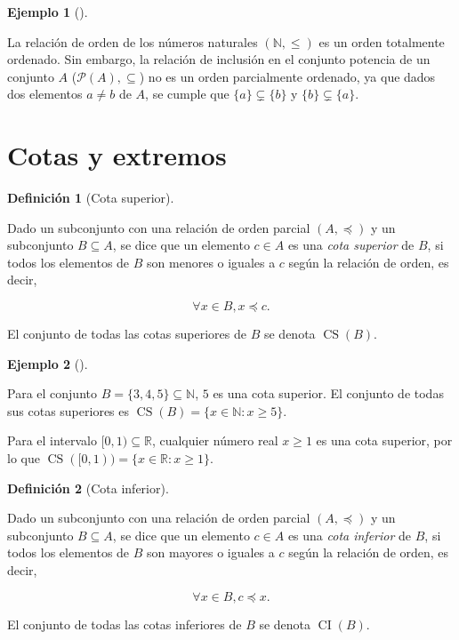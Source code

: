 \documentclass[
  a4paper,
]{scrreport}
\theoremstyle{definition}
\newtheorem{example}{Ejemplo}[chapter]
\theoremstyle{plain}
\theoremstyle{plain}
\theoremstyle{definition}
\newtheorem{definition}{Definición}[chapter]
\theoremstyle{plain}
\theoremstyle{remark}
\begin{document}
\begin{example}[]\protect\hypertarget{exm-relacion-orden-total}{}\label{exm-relacion-orden-total}

La relación de orden de los números naturales \((\mathbb{N},\leq)\) es
un orden totalmente ordenado. Sin embargo, la relación de inclusión en
el conjunto potencia de un conjunto \(A\) (\(\mathcal{P}(A),\subseteq\))
no es un orden parcialmente ordenado, ya que dados dos elementos
\(a\neq b\) de \(A\), se cumple que \(\{a\}\subsetneq \{b\}\) y
\(\{b\}\subsetneq \{a\}\).

\end{example}

\hypertarget{cotas-y-extremos}{%
\section{Cotas y extremos}\label{cotas-y-extremos}}

\begin{definition}[Cota
superior]\protect\hypertarget{def-cota-superior-conjunto}{}\label{def-cota-superior-conjunto}

Dado un subconjunto con una relación de orden parcial \((A,\preceq)\) y
un subconjunto \(B\subseteq A\), se dice que un elemento \(c\in A\) es
una \emph{cota superior} de \(B\), si todos los elementos de \(B\) son
menores o iguales a \(c\) según la relación de orden, es decir,

\[\forall x \in B, x\preceq c.\]

El conjunto de todas las cotas superiores de \(B\) se denota
\(\operatorname{CS}(B)\).

\end{definition}

\begin{example}[]\protect\hypertarget{exm-cota-superior}{}\label{exm-cota-superior}

Para el conjunto \(B=\{3, 4, 5\}\subseteq \mathbb{N}\), \(5\) es una
cota superior. El conjunto de todas sus cotas superiores es
\(\operatorname{CS}(B)=\{x\in \mathbb{N}:x\geq 5\}\).

Para el intervalo \([0,1)\subseteq \mathbb{R}\), cualquier número real
\(x\geq 1\) es una cota superior, por lo que
\(\operatorname{CS}([0,1)) = \{x\in \mathbb{R}:x\geq 1\}\).

\end{example}

\begin{definition}[Cota
inferior]\protect\hypertarget{def-cota-inferior-conjunto}{}\label{def-cota-inferior-conjunto}

Dado un subconjunto con una relación de orden parcial \((A,\preceq)\) y
un subconjunto \(B\subseteq A\), se dice que un elemento \(c\in A\) es
una \emph{cota inferior} de \(B\), si todos los elementos de \(B\) son
mayores o iguales a \(c\) según la relación de orden, es decir,

\[\forall x \in B, c\preceq x.\]

El conjunto de todas las cotas inferiores de \(B\) se denota
\(\operatorname{CI}(B)\).

\end{definition}
\end{document}
